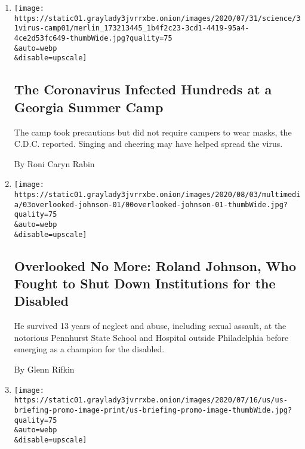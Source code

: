 \begin{enumerate}
\def\labelenumi{\arabic{enumi}.}
\item
  \href{/2020/07/31/health/coronavirus-children-camp.html}{}

  \texttt{[image: https://static01.graylady3jvrrxbe.onion/images/2020/07/31/science/31virus-camp01/merlin\_173213445\_1b4f2c23-3cd1-4419-95a4-4ce2d53fc649-thumbWide.jpg?quality=75\\\&auto=webp\\\&disable=upscale]}

  \hypertarget{the-coronavirus-infected-hundreds-at-a-georgia-summer-camp}{%
  \subsection{The Coronavirus Infected Hundreds at a Georgia Summer
  Camp}\label{the-coronavirus-infected-hundreds-at-a-georgia-summer-camp}}

  The camp took precautions but did not require campers to wear masks,
  the C.D.C. reported. Singing and cheering may have helped spread the
  virus.

  By Roni Caryn Rabin
\item
  \href{/2020/07/31/obituaries/roland-johnson-overlooked.html}{}

  \texttt{[image: https://static01.graylady3jvrrxbe.onion/images/2020/08/03/multimedia/03overlooked-johnson-01/00overlooked-johnson-01-thumbWide.jpg?quality=75\\\&auto=webp\\\&disable=upscale]}

  \hypertarget{overlooked-no-more-roland-johnson-who-fought-to-shut-down-institutions-for-the-disabled}{%
  \subsection{Overlooked No More: Roland Johnson, Who Fought to Shut
  Down Institutions for the
  Disabled}\label{overlooked-no-more-roland-johnson-who-fought-to-shut-down-institutions-for-the-disabled}}

  He survived 13 years of neglect and abuse, including sexual assault,
  at the notorious Pennhurst State School and Hospital outside
  Philadelphia before emerging as a champion for the disabled.

  By Glenn Rifkin
\item
  \href{/2020/07/31/world/coronavirus-covid-19.html}{}

  \texttt{[image: https://static01.graylady3jvrrxbe.onion/images/2020/07/16/us/us-briefing-promo-image-print/us-briefing-promo-image-thumbWide.jpg?quality=75\\\&auto=webp\\\&disable=upscale]}


\end{enumerate}
